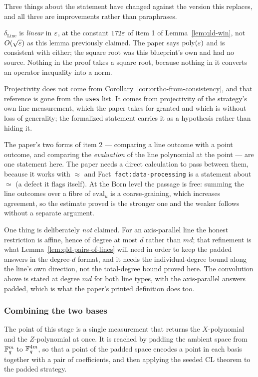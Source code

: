 Three things about the statement have changed against the version this replaces, and all three are
improvements rather than paraphrases.

$\delta_{\mathrm{Line}}$ is \emph{linear} in $\varepsilon$, at the constant $172\varepsilon$ of item 1 of
Lemma~\ref{lem:qld-win}, not $O(\sqrt{\varepsilon})$ as this lemma previously claimed. The paper says
$\mathrm{poly}(\varepsilon)$ and is consistent with either; the square root was this blueprint's own and had no
source. Nothing in the proof takes a square root, because nothing in it converts an operator
inequality into a norm.

Projectivity does not come from Corollary~\ref{cor:ortho-from-consistency}, and that reference is
gone from the \texttt{uses} list. It comes from projectivity of the strategy's own line
measurement, which the paper takes for granted and which is without loss of generality; the
formalized statement carries it as a hypothesis rather than hiding it.

The paper's two forms of item 2 --- comparing a line outcome with a point outcome, and comparing
the \emph{evaluation} of the line polynomial at the point --- are one statement here. The paper
needs a direct calculation to pass between them, because it works with $\approx$ and
Fact~\texttt{fact:data-processing} is a statement about $\simeq$ (a defect it flags itself). At the
Born level the passage is free: summing the line outcomes over a fibre of $\mathrm{eval}_u$ is a
coarse-graining, which increases agreement, so the estimate proved is the stronger one and the
weaker follows without a separate argument.

One thing is deliberately \emph{not} claimed. For an axis-parallel line the honest restriction is
affine, hence of degree at most $d$ rather than $md$; that refinement is what
Lemma~\ref{lem:qld-pairs-of-lines} will need in order to keep the padded answers in the
degree-$d$ format, and it needs the individual-degree bound along the line's own direction, not
the total-degree bound proved here. The convolution above is stated at degree $md$ for both line
types, with the axis-parallel answers padded, which is what the paper's printed definition does
too.

\subsubsection{Combining the two bases}

The point of this stage is a single measurement that returns the $X$-polynomial and the
$Z$-polynomial at once. It is reached by padding the ambient space from $\mathbb{F}_q^m$ to
$\mathbb{F}_q^{4m}$, so that a point of the padded space encodes a point in each basis together with
a pair of coefficients, and then applying the seeded CL theorem to the padded
strategy.

